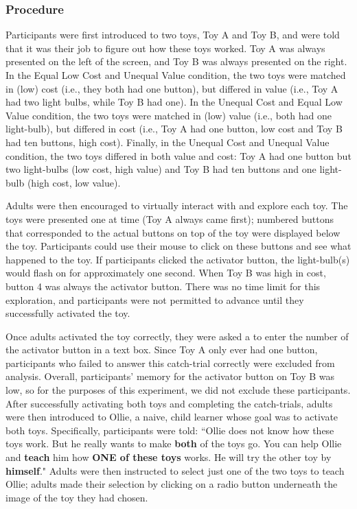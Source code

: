 \documentclass[10pt,letterpaper]{article}
\begin{document}
\subsubsection{Procedure}

Participants were first introduced to two toys, Toy A and Toy B, and were told that it was their job to figure out how these toys worked. Toy A was always presented on the left of the screen, and Toy B was always presented on the right. In the Equal Low Cost and Unequal Value condition, the two toys were matched in (low) cost (i.e., they both had one button), but differed in value (i.e., Toy A had two light bulbs, while Toy B had one). In the Unequal Cost and Equal Low Value condition, the two toys were matched in (low) value (i.e., both had one light-bulb), but differed in cost (i.e., Toy A had one button, low cost and Toy B had ten buttons, high cost). Finally, in the Unequal Cost and Unequal Value condition, the two toys differed in both value and cost: Toy A had one button but two light-bulbs (low cost, high value) and Toy B had ten buttons and one light-bulb (high cost, low value). 

Adults were then encouraged to virtually interact with and explore each toy. The toys were presented one at time (Toy A always came first); numbered buttons that corresponded to the actual buttons on top of the toy were displayed below the toy. Participants could use their mouse to click on these buttons and see what happened to the toy. If participants clicked the activator button, the light-bulb(s) would flash on for approximately one second. When Toy B was high in cost, button 4 was always the activator button. There was no time limit for this exploration, and participants were not permitted to advance until they successfully activated the toy. 

Once adults activated the toy correctly, they were asked a to enter the number of the activator button in a text box. Since Toy A only ever had one button, participants who failed to answer this catch-trial correctly were excluded from analysis. Overall, participants' memory for the activator button on Toy B was low, so for the purposes of this experiment, we did not exclude these participants. After successfully activating both toys and completing the catch-trials, adults were then introduced to Ollie, a naive, child learner whose goal was to activate both toys. Specifically, participants were told: ``Ollie does not know how these toys work. But he really wants to make \textbf{both} of the toys go. You can help Ollie and \textbf{teach} him how \textbf{ONE of these toys} works. He will try the other toy by \textbf{himself}." Adults were then instructed to select just one of the two toys to teach Ollie; adults made their selection by clicking on a radio button underneath the image of the toy they had chosen. 
\end{document}
